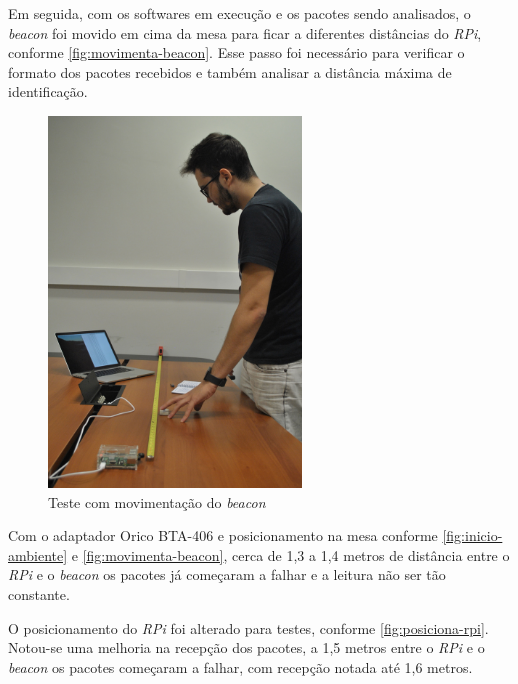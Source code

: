 \documentclass[
		12pt,				%
		openright,			%
		oneside,			%
		a4paper,			%
		chapter=TITLE,		%
		english,			%
		brazil				%
	]{abntex2}
\begin{document}
Em seguida, com os softwares em execução e os pacotes sendo analisados, o \textit{beacon} foi movido em cima da mesa para ficar a diferentes distâncias do \textit{RPi}, conforme \autoref{fig:movimenta-beacon}. Esse passo foi necessário para verificar o formato dos pacotes recebidos e também analisar a distância máxima de identificação.

\begin{figure}[htb]
	\caption{\label{fig:movimenta-beacon}Teste com movimentação do \textit{beacon}}
	\begin{center}
		\includegraphics[width=0.6\textwidth]{img/ambiente4.jpg}
	\end{center}
\end{figure}

Com o adaptador Orico BTA-406 e posicionamento na mesa conforme \autoref{fig:inicio-ambiente} e \autoref{fig:movimenta-beacon}, cerca de 1,3 a 1,4 metros de distância entre o \textit{RPi} e o \textit{beacon} os pacotes já começaram a falhar e a leitura não ser tão constante.

O posicionamento do \textit{RPi} foi alterado para testes, conforme \autoref{fig:posiciona-rpi}. Notou-se uma melhoria na recepção dos pacotes, a 1,5 metros entre o \textit{RPi} e o \textit{beacon} os pacotes começaram a falhar, com recepção notada até 1,6 metros.
\end{document}

